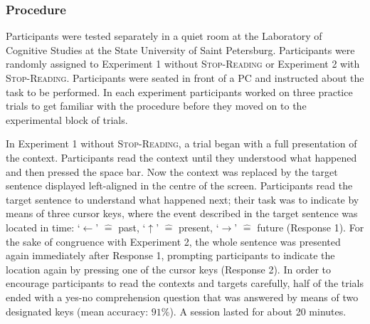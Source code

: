\documentclass[output=paper,colorlinks,citecolor=brown,newtxmath,hidelinks]{langscibook}
\begin{document}
\subsubsection{Procedure}\label{sct:zwei.eins.drei}

Participants were tested separately in a quiet room at the Laboratory of Cognitive Studies at the State University of Saint Petersburg. Participants were randomly assigned to Experiment 1 without \textsc{Stop-Reading} or Experiment 2 with \textsc{Stop-Reading}. Participants were seated in front of a PC and instructed about the task to be performed. In each experiment participants worked on three practice trials to get familiar with the procedure before they moved on to the experimental block of trials.

In Experiment 1 without \textsc{Stop-Reading}, a trial began with a full presentation of the context. Participants read the context until they understood what happened and then pressed the space bar. Now the context was replaced by the target sentence displayed left-aligned in the centre of the screen. Participants read the target sentence to understand what happened next; their task was to indicate by means of three cursor keys, where the event described in the target sentence was located in time: ‘$\leftarrow$’ $\hat{=}$ past, ‘$\uparrow$’ $\hat{=}$ present, ‘$\rightarrow$’ $\hat{=}$ future (Response 1). For the sake of congruence with Experiment 2, the whole sentence was presented again immediately after Response 1, prompting participants to indicate the location again by pressing one of the cursor keys (Response 2). In order to encourage participants to read the contexts and targets carefully, half of the trials ended with a yes-no comprehension question that was answered by means of two designated keys (mean accuracy: $91\%$). A session lasted for about 20 minutes.
\end{document}
